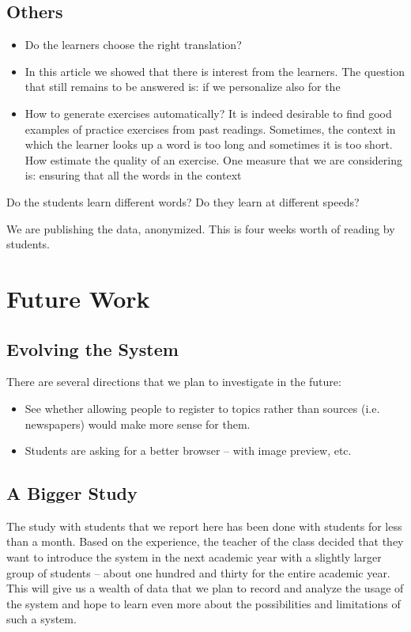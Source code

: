 \subsection{Others}
\begin{itemize}
	\item Do the learners choose the right translation? 
	\item In this article we showed that there is interest from the learners. The question that still remains to be answered is: if we personalize also for the 
	\item How to generate exercises automatically? It is indeed desirable to find good examples of practice exercises from past readings. Sometimes, the context in which the learner looks up a word is too long and sometimes it is too short. How estimate the quality of an exercise. One measure that we are considering is: ensuring that all the words in the context  
\end{itemize}

Do the students learn different words? Do they learn at different speeds? 

We are publishing the data, anonymized. This is four weeks worth of reading by \stcnt students.


\section{Future Work}


\subsection{Evolving the System}
There are several directions that we plan to investigate in the future: 

\begin{itemize}

	\item See whether allowing people to register to topics rather than sources (i.e. newspapers) would make more sense for them. 

	\item Students are asking for a better browser -- with image preview, etc.

\end{itemize}

\subsection{A Bigger Study}
The study with students that we report here has been done with \stcnt students for less than a month. Based on the experience, the teacher of the class decided that they want to introduce the system in the next academic year with a slightly larger group of students -- about one hundred and thirty for the entire academic year. This will give us a wealth of data that we plan to record and analyze the usage of the system and hope to learn even more about the possibilities and limitations of such a system. 

